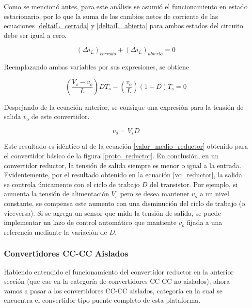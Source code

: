 Como se mencionó antes, para este análisis se asumió el funcionamiento en estado estacionario, por lo que la suma de los cambios netos de corriente de las ecuaciones \ref{deltaiL_cerrada} y \ref{deltaiL_abierta} para ambos estados del circuito debe ser igual a cero.

\begin{equation}
    (\Delta i_L)_{cerrado} + (\Delta i_L)_{abierto} = 0
\end{equation}

Reemplazando ambas variables por sus expresiones, se obtiene

\begin{equation*}
    \left(\frac{V_s - v_o}{L}\right)DT_s - \left(\frac{v_o}{L}\right)(1-D)T_s  = 0
\end{equation*}

Despejando de la ecuación anterior, se consigue una expresión para la tensión de salida $v_o$ de este convertidor.

\begin{equation}\label{vo_reductor}
    \boxed{
        v_o = V_sD
    }
\end{equation}

Este resultado es idéntico al de la ecuación \ref{valor_medio_reductor} obtenido para el convertidor básico de la figura \ref{proto_reductor}. En conclusión, {\Medium en un convertidor reductor, la tensión de salida siempre es menor o igual a la entrada}.\\

Evidentemente, por el resultado obtenido en la ecuación \ref{vo_reductor}, la salida se controla únicamente con el ciclo de trabajo $D$ del transistor. Por ejemplo, si aumenta la tensión de alimentación $V_s$ pero se desea mantener $v_o$ a un nivel constante, se compensa este aumento con una disminución del ciclo de trabajo (o viceversa). Si se agrega un sensor que mida la tensión de salida, se puede implementar un lazo de control automático que mantiente $v_o$ fijada a una referencia mediante la variación de $D$.\\

\subsubsection{Convertidores CC-CC Aislados}

Habiendo entendido el funcionamiento del convertidor reductor en la anterior sección (que cae en la categoría de convertidores CC-CC no aislados), ahora vamos a pasar a los convertidores CC-CC aislados, categoría en la cual se encuentra el convertidor tipo puente completo de esta plataforma.\\

